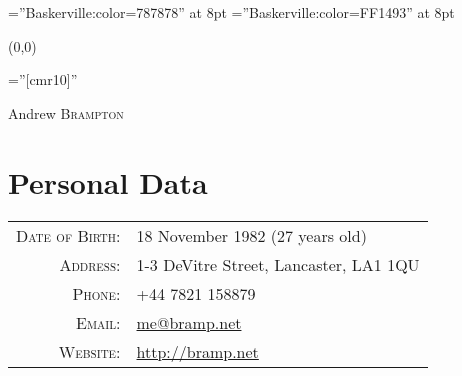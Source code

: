 \documentclass[a4paper,10pt]{article}
\begin{document}
\font\wm=''Baskerville:color=787878'' at 8pt
\font\wmweb=''Baskerville:color=FF1493'' at 8pt
{\wm 
	\begin{textblock}{1}(0,0)
	\end{textblock}
}

\pagestyle{empty} %

\font\fb=''[cmr10]'' %

\par{\centering
		{\Huge Andrew \textsc{Brampton}
	}\bigskip\par}

\section{Personal Data}

\begin{tabular}{rl}
    \textsc{Date of Birth:} & 18 November 1982 (27 years old) \\
    \textsc{Address:}   & 1-3 DeVitre Street, Lancaster, LA1 1QU \\
    \textsc{Phone:}     & +44 7821 158879\\
    \textsc{Email:}     & \href{mailto:me@bramp.net}{me@bramp.net}\\
    \textsc{Website:}   & \href{mailto:http://bramp.net}{http://bramp.net}\\
\end{tabular}

\end{document}
